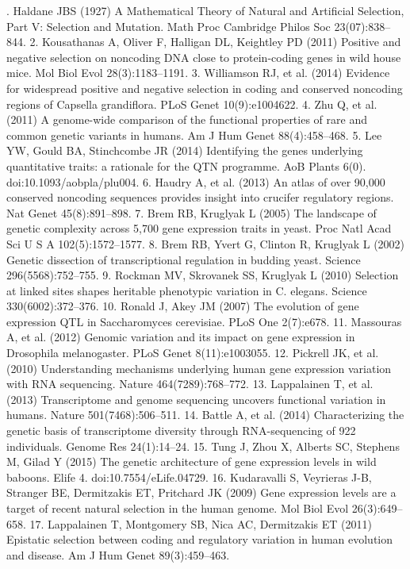 . 	Haldane JBS (1927) A Mathematical Theory of Natural and Artificial Selection, Part V: Selection and Mutation. Math Proc Cambridge Philos Soc 23(07):838–844.
2. 	Kousathanas A, Oliver F, Halligan DL, Keightley PD (2011) Positive and negative selection on noncoding DNA close to protein-coding genes in wild house mice. Mol Biol Evol 28(3):1183–1191.
3. 	Williamson RJ, et al. (2014) Evidence for widespread positive and negative selection in coding and conserved noncoding regions of Capsella grandiflora. PLoS Genet 10(9):e1004622.
4. 	Zhu Q, et al. (2011) A genome-wide comparison of the functional properties of rare and common genetic variants in humans. Am J Hum Genet 88(4):458–468.
5. 	Lee YW, Gould BA, Stinchcombe JR (2014) Identifying the genes underlying quantitative traits: a rationale for the QTN programme. AoB Plants 6(0). doi:10.1093/aobpla/plu004.
6. 	Haudry A, et al. (2013) An atlas of over 90,000 conserved noncoding sequences provides insight into crucifer regulatory regions. Nat Genet 45(8):891–898.
7. 	Brem RB, Kruglyak L (2005) The landscape of genetic complexity across 5,700 gene expression traits in yeast. Proc Natl Acad Sci U S A 102(5):1572–1577.
8. 	Brem RB, Yvert G, Clinton R, Kruglyak L (2002) Genetic dissection of transcriptional regulation in budding yeast. Science 296(5568):752–755.
9. 	Rockman MV, Skrovanek SS, Kruglyak L (2010) Selection at linked sites shapes heritable phenotypic variation in C. elegans. Science 330(6002):372–376.
10. 	Ronald J, Akey JM (2007) The evolution of gene expression QTL in Saccharomyces cerevisiae. PLoS One 2(7):e678.
11. 	Massouras A, et al. (2012) Genomic variation and its impact on gene expression in Drosophila melanogaster. PLoS Genet 8(11):e1003055.
12. 	Pickrell JK, et al. (2010) Understanding mechanisms underlying human gene expression variation with RNA sequencing. Nature 464(7289):768–772.
13. 	Lappalainen T, et al. (2013) Transcriptome and genome sequencing uncovers functional variation in humans. Nature 501(7468):506–511.
14. 	Battle A, et al. (2014) Characterizing the genetic basis of transcriptome diversity through RNA-sequencing of 922 individuals. Genome Res 24(1):14–24.
15. 	Tung J, Zhou X, Alberts SC, Stephens M, Gilad Y (2015) The genetic architecture of gene expression levels in wild baboons. Elife 4. doi:10.7554/eLife.04729.
16. 	Kudaravalli S, Veyrieras J-B, Stranger BE, Dermitzakis ET, Pritchard JK (2009) Gene expression levels are a target of recent natural selection in the human genome. Mol Biol Evol 26(3):649–658.
17. 	Lappalainen T, Montgomery SB, Nica AC, Dermitzakis ET (2011) Epistatic selection between coding and regulatory variation in human evolution and disease. Am J Hum Genet 89(3):459–463.

